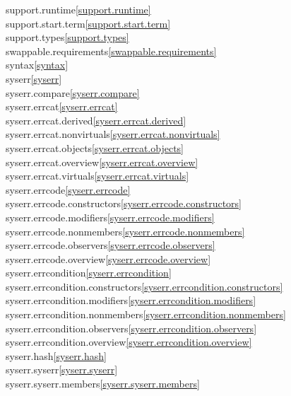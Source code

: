 \begin{multicols}{2}
support.runtime\quad\ref{support.runtime}\\
support.start.term\quad\ref{support.start.term}\\
support.types\quad\ref{support.types}\\
swappable.requirements\quad\ref{swappable.requirements}\\
syntax\quad\ref{syntax}\\
syserr\quad\ref{syserr}\\
syserr.compare\quad\ref{syserr.compare}\\
syserr.errcat\quad\ref{syserr.errcat}\\
syserr.errcat.derived\quad\ref{syserr.errcat.derived}\\
syserr.errcat.nonvirtuals\quad\ref{syserr.errcat.nonvirtuals}\\
syserr.errcat.objects\quad\ref{syserr.errcat.objects}\\
syserr.errcat.overview\quad\ref{syserr.errcat.overview}\\
syserr.errcat.virtuals\quad\ref{syserr.errcat.virtuals}\\
syserr.errcode\quad\ref{syserr.errcode}\\
syserr.errcode.constructors\quad\ref{syserr.errcode.constructors}\\
syserr.errcode.modifiers\quad\ref{syserr.errcode.modifiers}\\
syserr.errcode.nonmembers\quad\ref{syserr.errcode.nonmembers}\\
syserr.errcode.observers\quad\ref{syserr.errcode.observers}\\
syserr.errcode.overview\quad\ref{syserr.errcode.overview}\\
syserr.errcondition\quad\ref{syserr.errcondition}\\
syserr.errcondition.constructors\quad\ref{syserr.errcondition.constructors}\\
syserr.errcondition.modifiers\quad\ref{syserr.errcondition.modifiers}\\
syserr.errcondition.nonmembers\quad\ref{syserr.errcondition.nonmembers}\\
syserr.errcondition.observers\quad\ref{syserr.errcondition.observers}\\
syserr.errcondition.overview\quad\ref{syserr.errcondition.overview}\\
syserr.hash\quad\ref{syserr.hash}\\
syserr.syserr\quad\ref{syserr.syserr}\\
syserr.syserr.members\quad\ref{syserr.syserr.members}\\

\end{multicols}
